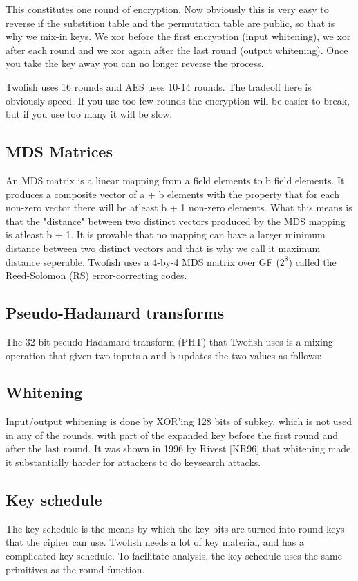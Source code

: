 This constitutes one round of encryption. Now obviously this is very easy to reverse if the substition table and the permutation table are public, so that is why we mix-in keys. We xor before the first encryption (input whitening), we xor after each round and we xor again after the last round (output whitening). Once you take the key away you can no longer reverse the process.

Twofish uses 16 rounds and AES uses 10-14 rounds. The tradeoff here is obviously speed. If you use too few rounds the encryption will be easier to break, but if you use too many it will be slow.


\subsection{MDS Matrices}
An MDS matrix is a linear mapping from a field elements to b field elements. It produces a composite vector of a + b elements with the property that for each non-zero vector there will be atleast b + 1 non-zero elements.
What this means is that the "distance" between two distinct vectors produced by the MDS mapping is atleast b + 1.
It is provable that no mapping can have a larger minimum distance between two distinct vectors and that is why we call it maximum distance seperable.
Twofish uses a 4-by-4 MDS matrix over GF ($2^8$) called the Reed-Solomon (RS) error-correcting codes.

\subsection{Pseudo-Hadamard transforms}
The 32-bit pseudo-Hadamard transform (PHT) that Twofish uses is a mixing operation that given two inputs a and b updates the two values as follows:

\subsection{Whitening}
Input/output whitening is done by XOR'ing 128 bits of subkey, which is not used in any of the rounds, with part of the expanded key before the first round and after the last round. It was shown in 1996 by Rivest [KR96] that whitening made it substantially harder for attackers to do keysearch attacks.

\subsection{Key schedule}
The key schedule is the means by which the key bits are turned into round keys that the cipher can use.  Twofish needs a lot of key material, and has a complicated key schedule. To facilitate analysis, the key schedule uses the same primitives as the round function.

